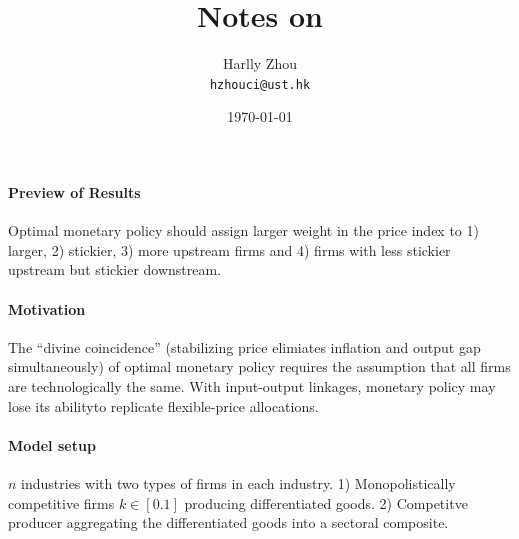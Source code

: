 \documentclass[12pt]{article}
\title{Notes on \cite{laoOptimalMonetaryPolicy2022}}
\author{Harlly Zhou \\ \texttt{hzhouci@ust.hk}}
\date{\today}
\numberwithin{equation}{section}
\begin{document}
\maketitle

\paragraph{Preview of Results} Optimal monetary policy should assign larger weight in the price index to 1) larger, 2) stickier, 3) more upstream firms and 4) firms with less stickier upstream but stickier downstream.

\paragraph{Motivation} The ``divine coincidence'' (stabilizing price elimiates inflation and output gap simultaneously) of optimal monetary policy requires the assumption that all firms are technologically the same. With input-output linkages, monetary policy may lose its abilityto replicate flexible-price allocations.

\paragraph{Model setup} $n$ industries with two types of firms in each industry. 1) Monopolistically competitive firms $k\in[0.1]$ producing differentiated goods. 2) Competitve producer aggregating the differentiated goods into a sectoral composite. 
\end{document}
